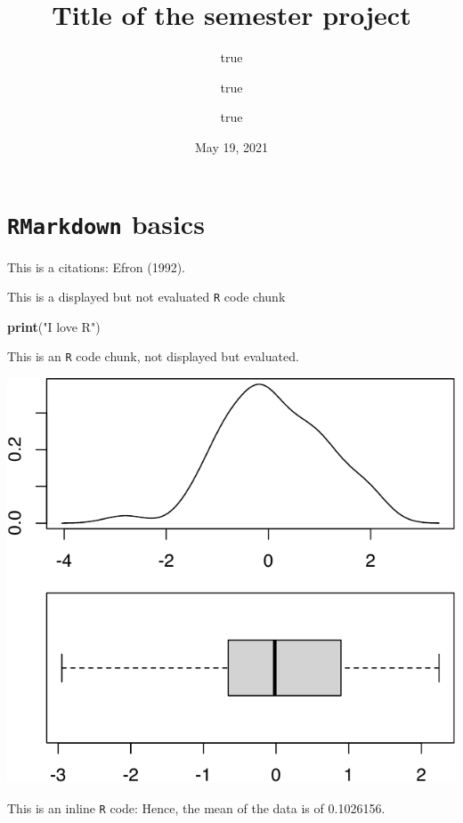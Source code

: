 \documentclass[11pt,]{article}
\title{Title of the semester project}
\author{true \and true \and true}
\date{May 19, 2021}
\newenvironment{Shaded}{\begin{snugshade}}{\end{snugshade}}
\newcommand{\KeywordTok}[1]{\textcolor[rgb]{0.13,0.29,0.53}{\textbf{#1}}}
\newcommand{\NormalTok}[1]{#1}
\newcommand{\StringTok}[1]{\textcolor[rgb]{0.31,0.60,0.02}{#1}}
\begin{document}
\maketitle

\hypertarget{rmarkdown-basics}{%
\section{\texorpdfstring{\texttt{RMarkdown}
basics}{RMarkdown basics}}\label{rmarkdown-basics}}

This is a citations: Efron (1992).

This is a displayed but not evaluated \texttt{R} code chunk

\begin{Shaded}
\begin{Highlighting}[]
\KeywordTok{print}\NormalTok{(}\StringTok{"I love R"}\NormalTok{)}
\end{Highlighting}
\end{Shaded}

This is an \texttt{R} code chunk, not displayed but evaluated.

\begin{center}\includegraphics{RapportSTAT_files/figure-latex/unnamed-chunk-2-1} \end{center}

This is an inline \texttt{R} code: Hence, the mean of the data is of
0.1026156.
\end{document}
